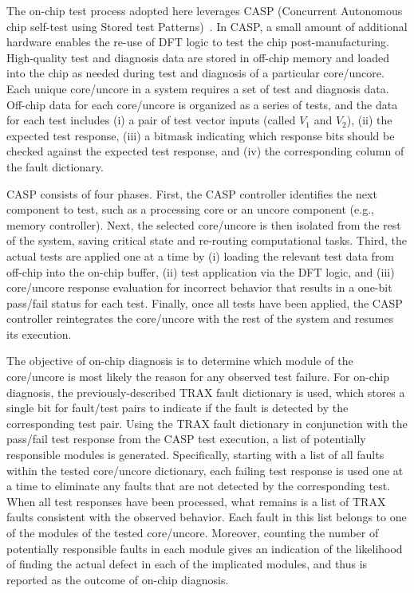 The on-chip test process adopted here leverages CASP (Concurrent Autonomous chip self-test using Stored test Patterns)~\cite{li08}.
%
In CASP, a small amount of additional hardware enables the re-use of DFT logic to test the chip post-manufacturing.
%
High-quality test and diagnosis data are stored in off-chip memory and loaded into the chip as needed during test and diagnosis of a particular core/uncore.
%
Each unique core/uncore in a system requires a set of test and diagnosis data.
%
Off-chip data for each core/uncore is organized as a series of tests, and the data for each test includes (i) a pair of test vector inputs (called $V_1$ and $V_2$), (ii) the expected test response, (iii) a bitmask indicating which response bits should be checked against the expected test response, and (iv) the corresponding column of the fault dictionary.

CASP consists of four phases.
%
First, the CASP controller identifies the next component to test, such as a processing core or an uncore component (e.g., memory controller).
%
Next, the selected core/uncore is then isolated from the rest of the system, saving critical state and re-routing computational tasks.
%
Third, the actual tests are applied one at a time by (i) loading the relevant test data from off-chip into the on-chip buffer, (ii) test application via the DFT logic, and (iii) core/uncore response evaluation for incorrect behavior that results in a one-bit pass/fail status for each test.
%
Finally, once all tests have been applied, the CASP controller reintegrates the core/uncore with the rest of the system and resumes its execution.

The objective of on-chip diagnosis is to determine which module of the core/uncore is most likely the reason for any observed test failure.
%
For on-chip diagnosis, the previously-described TRAX fault dictionary is used, which stores a single bit for fault/test pairs to indicate if the fault is detected by the corresponding test pair.
%
Using the TRAX fault dictionary in conjunction with the pass/fail test response from the CASP test execution, a list of potentially responsible modules is generated.
%
Specifically, starting with a list of all faults within the tested core/uncore dictionary, each failing test response is used one at a time to eliminate any faults that are not detected by the corresponding test.
%
When all test responses have been processed, what remains is a list of TRAX faults consistent with the observed behavior.
%
Each fault in this list belongs to one of the modules of the tested core/uncore.
%
Moreover, counting the number of potentially responsible faults in each module gives an indication of the likelihood of finding the actual defect in each of the implicated modules, and thus is reported as the outcome of on-chip diagnosis.

